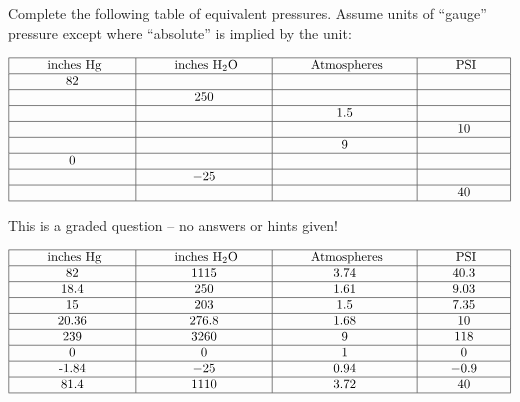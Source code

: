 

Complete the following table of equivalent pressures.  Assume units of ``gauge'' pressure except where ``absolute'' is implied by the unit:


$$\vbox{\offinterlineskip
\halign{\strut
\vrule \quad\hfil # \ \hfil & 
\vrule \quad\hfil # \ \hfil & 
\vrule \quad\hfil # \ \hfil & 
\vrule \quad\hfil # \ \hfil \vrule \cr
\noalign{\hrule}
%
\hskip 20pt inches Hg \hskip 20pt & \hskip 20pt inches H$_{2}$O \hskip 20pt & \hskip 20pt Atmospheres \hskip 20pt & \hskip 20pt PSI \hskip 20pt \cr
%
\noalign{\hrule}
%
82 &  &  &  \cr
%
\noalign{\hrule}
%
  & 250 &  &  \cr
%
\noalign{\hrule}
%
  &  & 1.5 &  \cr
%
\noalign{\hrule}
%
  &  &  & 10 \cr
%
\noalign{\hrule}
%
  &  & 9 &  \cr
%
\noalign{\hrule}
%
0 &  &  &  \cr
%
\noalign{\hrule}
%
  & $-25$ &  &  \cr
%
\noalign{\hrule}
%
  &  &  & 40 \cr
%
\noalign{\hrule}
} %
}$$ %

\vfil 

\eject






This is a graded question -- no answers or hints given!








$$\vbox{\offinterlineskip
\halign{\strut
\vrule \quad\hfil # \ \hfil & 
\vrule \quad\hfil # \ \hfil & 
\vrule \quad\hfil # \ \hfil & 
\vrule \quad\hfil # \ \hfil \vrule \cr
\noalign{\hrule}
%
\hskip 20pt inches Hg \hskip 20pt & \hskip 20pt inches H$_{2}$O \hskip 20pt & \hskip 20pt Atmospheres \hskip 20pt & \hskip 20pt PSI \hskip 20pt \cr
%
\noalign{\hrule}
%
82 & 1115 & 3.74 & 40.3 \cr
%
\noalign{\hrule}
%
18.4 & 250 & 1.61 & 9.03 \cr
%
\noalign{\hrule}
%
15 & 203 & 1.5 & 7.35 \cr
%
\noalign{\hrule}
%
20.36 & 276.8 & 1.68 & 10 \cr
%
\noalign{\hrule}
%
239 & 3260 & 9 & 118 \cr
%
\noalign{\hrule}
%
0 & 0 & 1 & 0 \cr
%
\noalign{\hrule}
%
-1.84 & $-25$ & 0.94 & $-0.9$ \cr
%
\noalign{\hrule}
%
81.4 & 1110 & 3.72 & 40 \cr
%
\noalign{\hrule}
} %
}$$ %





